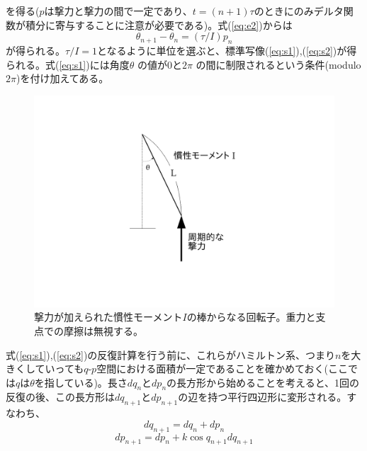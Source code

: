 \documentclass{jsarticle}
\begin{document}
        を得る($p$は撃力と撃力の間で一定であり、$t=(n+1)\tau$のときにのみデルタ関数が積分に寄与することに注意が必要である)。式(\ref{eq:e2})からは
        \begin{equation}
            \theta_{n+1} - \theta_{n} = (\tau/I)p_{n}
        \end{equation}
        が得られる。$\tau/I = 1$となるように単位を選ぶと、標準写像(\ref{eq:s1}),(\ref{eq:s2})が得られる。式(\ref{eq:s1})には角度$\theta$ の値が$0$と$2\pi$ の間に制限されるという条件(modulo $2\pi$)を付け加えてある。
        \begin{figure}[H]
            \begin{center}
                \includegraphics[width=12.5cm]{figure_1.pdf}
                \caption{撃力が加えられた慣性モーメント$I$の棒からなる回転子。重力と支点での摩擦は無視する。}
                \label{fig:f1}
            \end{center}
        \end{figure}

        
        
        式(\ref{eq:s1}),(\ref{eq:s2})の反復計算を行う前に、これらがハミルトン系、つまり$n$を大きくしていっても$q$-$p$空間における面積が一定であることを確かめておく(ここでは$q$は$\theta$を指している)。長さ$dq_{n}$と$dp_{n}$の長方形から始めることを考えると、1回の反復の後、この長方形は$dq_{n+1}$と$dp_{n+1}$の辺を持つ平行四辺形に変形される。すなわち、
        \begin{equation}
            dq_{n+1} = dq_{n} + dp_{n}
            \label{eq:e3}
        \end{equation}
        \begin{equation}
            dp_{n+1} = dp_{n} + k \cos q_{n+1} dq_{n+1}
            \label{eq:e4}
        \end{equation}
\end{document}
